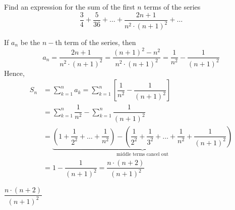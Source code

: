 

\question[2] Find an expression for the sum of the first $n$ terms of the series 
\[ \dfrac{3}{4} + \dfrac{5}{36} + \ldots + \dfrac{2n+1}{n^2\cdot(n+1)^2} + \ldots \]

\begin{solution}[\halfpage]
  If $a_n$ be the $n-$th term of the series, then 
  \[ a_n = \dfrac{2n+1}{n^2\cdot (n+1)^2} = \dfrac{(n+1)^2-n^2}{n^2\cdot (n+1)^2} = \dfrac{1}{n^2}-\dfrac{1}{(n+1)^2} \] 
  Hence, 
  \begin{align}
    S_n &= \sum_{k=1}^n a_k = \sum_{k=1}^n\left[ \dfrac{1}{n^2} - \dfrac{1}{(n+1)^2} \right] \\
    &= \sum_{k=1}^n \dfrac{1}{n^2} - \sum_{k=1}^n\dfrac{1}{(n+1)^2} \\
    &= \underbrace{\left( 1+\dfrac{1}{2^2}+ \ldots +\dfrac{1}{n^2} \right) - 
       \left( \dfrac{1}{2^2}+\dfrac{1}{3^2} + \ldots +\dfrac{1}{n^2} + \dfrac{1}{(n+1)^2} \right)}
       _{\text{middle terms cancel out}} \\
    &= 1-\dfrac{1}{(n+1)^2} = 
    \dfrac{n\cdot (n+2)}{(n+1)^2}
  \end{align} 
\end{solution}
\ifprintanswers\begin{codex}$\dfrac{n\cdot (n+2)}{(n+1)^2}$\end{codex}\fi
